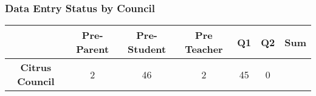 \documentclass[]{article}
\begin{document}
\subsubsection{Data Entry Status by
Council}\label{data-entry-status-by-council}

\begin{longtable}[]{@{}ccccccc@{}}
\toprule
\begin{minipage}[b]{0.26\columnwidth}\centering\strut
~\strut
\end{minipage} & \begin{minipage}[b]{0.13\columnwidth}\centering\strut
Pre-Parent\strut
\end{minipage} & \begin{minipage}[b]{0.14\columnwidth}\centering\strut
Pre-Student\strut
\end{minipage} & \begin{minipage}[b]{0.14\columnwidth}\centering\strut
Pre Teacher\strut
\end{minipage} & \begin{minipage}[b]{0.05\columnwidth}\centering\strut
Q1\strut
\end{minipage} & \begin{minipage}[b]{0.05\columnwidth}\centering\strut
Q2\strut
\end{minipage} & \begin{minipage}[b]{0.05\columnwidth}\centering\strut
Sum\strut
\end{minipage}\tabularnewline
\midrule
\endhead
\begin{minipage}[t]{0.26\columnwidth}\centering\strut
\textbf{Citrus Council}\strut
\end{minipage} & \begin{minipage}[t]{0.13\columnwidth}\centering\strut
2\strut
\end{minipage} & \begin{minipage}[t]{0.14\columnwidth}\centering\strut
46\strut
\end{minipage} & \begin{minipage}[t]{0.14\columnwidth}\centering\strut
2\strut
\end{minipage} & \begin{minipage}[t]{0.05\columnwidth}\centering\strut
45\strut
\end{minipage} & \begin{minipage}[t]{0.05\columnwidth}\centering\strut
0\strut
\end{minipage} & \begin{minipage}[t]{0.05\columnwidth}\centering\strut

\end{minipage}
\end{longtable}
\end{document}
